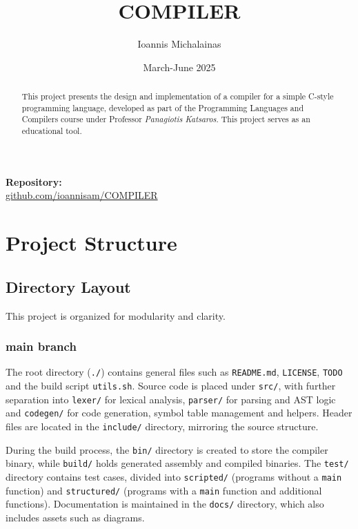 \documentclass{article}
\title{COMPILER}
\author{Ioannis Michalainas}
\date{March-June 2025}
\begin{document}
\maketitle
\begin{center}
  \textbf{Repository:} \\
  \href{https://github.com/ioannisam/compiler}{github.com/ioannisam/COMPILER}
\end{center}
\bigskip
\begin{abstract}
    This project presents the design and implementation of a compiler for a simple C-style programming language, developed as part of the Programming Languages and Compilers course under Professor \textit{Panagiotis Katsaros}. This project serves as an educational tool.
\end{abstract}

{\small
\tableofcontents
}
\clearpage

\section{Project Structure}
    \subsection{Directory Layout} 
    This project is organized for modularity and clarity. 

    \subsubsection*{main branch}
    The root directory (\texttt{./}) contains general files such as \texttt{README.md}, \texttt{LICENSE}, \texttt{TODO} and the build script \texttt{utils.sh}. Source code is placed under \texttt{src/}, with further separation into \texttt{lexer/} for lexical analysis, \texttt{parser/} for parsing and AST logic and \texttt{codegen/} for code generation, symbol table management and helpers. Header files are located in the \texttt{include/} directory, mirroring the source structure.
    
    During the build process, the \texttt{bin/} directory is created to store the compiler binary, while \texttt{build/} holds generated assembly and compiled binaries. The \texttt{test/} directory contains test cases, divided into \texttt{scripted/} (programs without a \texttt{main} function) and \texttt{structured/} (programs with a \texttt{main} function and additional functions). Documentation is maintained in the \texttt{docs/} directory, which also includes assets such as diagrams.
\end{document}
